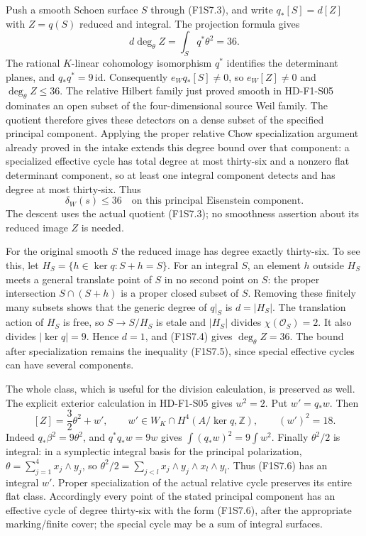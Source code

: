 Push a smooth Schoen surface $S$ through (F1S7.3), and write
$q_*[S]=d[Z]$ with $Z=q(S)$ reduced and integral. The projection
formula gives
\[
 d\deg_\theta Z=\int_Sq^*\theta^2=36.
 \tag{F1S7.4}
\]
The rational $K$-linear cohomology isomorphism $q^*$ identifies
the determinant planes, and $q_*q^*=9\,\mathrm{id}$.
Consequently $e_Wq_*[S]\ne0$, so $e_W[Z]\ne0$ and
$\deg_\theta Z\le36$.
The relative Hilbert family just proved smooth in HD-F1-S05
dominates an open subset of the four-dimensional source
Weil family. The quotient therefore gives these detectors on
a dense subset of the specified principal component. Applying
the proper relative Chow specialization argument already
proved in the intake extends this degree bound over that
component: a specialized effective cycle has total degree at
most thirty-six and a nonzero flat determinant component,
so at least one integral component detects and has degree at
most thirty-six. Thus
\[
 \delta_W(s)\le36
 \quad\text{on this principal Eisenstein component.}
 \tag{F1S7.5}
\]
The descent uses the actual quotient (F1S7.3); no smoothness
assertion about its reduced image $Z$ is needed.

For the original smooth $S$ the reduced image has degree
exactly thirty-six. To see this, let
$H_S=\{h\in\ker q:S+h=S\}$. For an integral $S$, an element
$h$ outside $H_S$ meets a general translate point of $S$
in no second point on $S$: the proper intersection
$S\cap(S+h)$ is a proper closed subset of $S$.
Removing these finitely many subsets shows that the generic
degree of $q|_S$ is $d=|H_S|$. The translation action of
$H_S$ is free, so $S\to S/H_S$ is etale and
$|H_S|$ divides $\chi(\mathcal O_S)=2$. It also divides
$|\ker q|=9$. Hence $d=1$, and (F1S7.4) gives
$\deg_\theta Z=36$. The bound after specialization remains
the inequality (F1S7.5), since special effective cycles can
have several components.

The whole class, which is useful for the division calculation,
is preserved as well. The explicit exterior calculation in
HD-F1-S05 gives $w^2=2$. Put $w'=q_*w$. Then
\[
 [Z]=\frac32\theta^2+w',\qquad
 w'\in W_K\cap H^4(A/\ker q,\mathbb Z),\qquad
 (w')^2=18.
 \tag{F1S7.6}
\]
Indeed $q_*\beta^2=9\theta^2$, and $q^*q_*w=9w$ gives
$\int(q_*w)^2=9\int w^2$. Finally $\theta^2/2$ is integral:
in a symplectic integral basis for the principal polarization,
$\theta=\sum_{j=1}^4x_j\wedge y_j$, so
$\theta^2/2=\sum_{j<l}x_j\wedge y_j\wedge x_l\wedge y_l$.
Thus (F1S7.6) has an integral $w'$. Proper specialization of
the actual relative cycle preserves its entire flat class.
Accordingly every point of the stated principal component
has an effective cycle of degree thirty-six with the form
(F1S7.6), after the appropriate marking/finite cover; the
special cycle may be a sum of integral surfaces.

